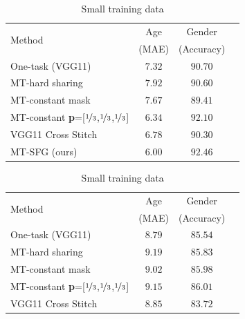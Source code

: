 \begin{table}[h]
	\begin{subtable}[t]{0.49\linewidth}
		\footnotesize
		\caption{Full training data}
		\vspace{-5mm}
		\begin{center}
			\begin{tabular}{lccc}
				\hline
				\toprule
				\multirow{2}{*}{Method}                      & Age   & Gender     \\
				& (MAE)   & (Accuracy)    \\
				\midrule
				One-task (VGG11) \cite{vgg}                       & $7.32$  & $90.70$                 \\
				\multirow{1}{*}{MT-hard sharing}   & $7.92$  & $90.60$ \\ 
				\multirow{1}{*}{MT-constant mask}   & $7.67$  & $89.41$                 \\
				\multirow{1}{*}{MT-constant \textbf{p}=[$\nicefrac{1}{3}$,$\nicefrac{1}{3}$,$\nicefrac{1}{3}$]}   & \cellcolor{blue!15} $6.34$  & \cellcolor{blue!15} $92.10$                 \\
				\multirow{1}{*}{VGG11 Cross Stitch \cite{MisraCrossMTL16}}   & $6.78$  & $90.30$                 \\
				\multirow{1}{*}{MT-SFG (ours)}       &  \cellcolor{red!15} $\mathbf{6.00}$  &  \cellcolor{red!15} $\mathbf{92.46}$                 \\
				\hline
			\end{tabular}
		\end{center}
		\label{tab:big_data}
	\end{subtable}
	\begin{subtable}[t]{0.49\linewidth}
		\footnotesize
		\caption{Small training data}
		\vspace{-5mm}
		\begin{center}
			\begin{tabular}{lccc}
				\hline
				\toprule
				\multirow{2}{*}{Method} & Age   & Gender     \\
				& (MAE)   & (Accuracy)    \\
				\midrule
				One-task (VGG11) \cite{vgg}                       & \cellcolor{blue!15}  $8.79$  & $85.54$                 \\
				\multirow{1}{*}{MT-hard sharing}   & $9.19$  & $85.83$                 \\
				\multirow{1}{*}{MT-constant mask}   & $9.02$  & $85.98$                \\
				\multirow{1}{*}{MT-constant \textbf{p}=[$\nicefrac{1}{3}$,$\nicefrac{1}{3}$,$\nicefrac{1}{3}$]}   & $9.15$  & \cellcolor{blue!15} $86.01$                 \\
				\multirow{1}{*}{VGG11 Cross Stitch \cite{MisraCrossMTL16}}   & $8.85$  &   $83.72$                 \\
				

\end{tabular}
\end{center}
\end{subtable}
\end{table}
